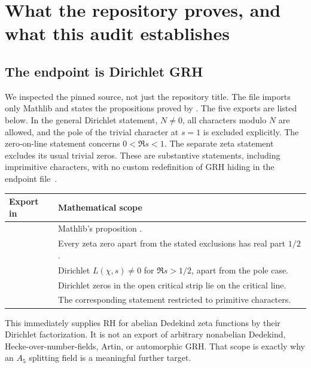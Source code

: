 \section{What the repository proves, and what this audit establishes}
\label{sec:audit}

\subsection{The endpoint is Dirichlet GRH}

We inspected the pinned source, not just the repository title.
The file  imports only Mathlib and states
the propositions proved by . The five exports are
listed below. In the general Dirichlet statement, \(N\ne0\), all characters
modulo \(N\) are allowed, and the pole of the trivial character at \(s=1\)
is excluded explicitly. The zero-on-line statement concerns
\(0<\Re s<1\). The separate zeta statement excludes its usual trivial
zeros. These are substantive statements, including imprimitive
characters, with no custom redefinition of GRH hiding in the
endpoint file~\cite{repo}.

\begin{center}
\small
\begin{tabularx}{\textwidth}{@{}p{76mm}Y@{}}
\toprule
Export in  & Mathematical scope\\
\midrule
{} & Mathlib's proposition .\\
 & Every zeta zero apart from the stated exclusions
has real part \(1/2\).\\
 &
Dirichlet \(L(\chi,s)\ne0\) for \(\Re s>1/2\), apart from the pole case.\\
 &
Dirichlet zeros in the open critical strip lie on the critical line.\\
 &
The corresponding statement restricted to primitive characters.\\
\bottomrule
\end{tabularx}
\end{center}

This immediately supplies RH for abelian Dedekind zeta functions by their
Dirichlet factorization. It is not an export of arbitrary nonabelian
Dedekind, Hecke-over-number-fields, Artin, or automorphic GRH.
That scope is exactly why an \(A_5\) splitting field is a meaningful
further target.

